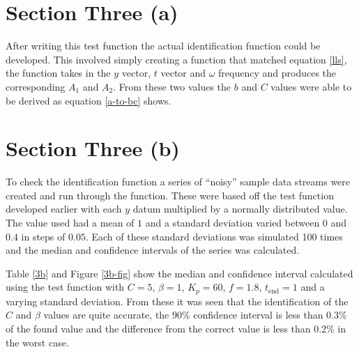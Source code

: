 \section*{Section Three (a)}

After writing this test function the actual identification function could be
developed.  This involved simply creating a function that matched equation
\ref{lls}, the function takes in the $y$ vector, $t$ vector and $\omega$
frequency and produces the corresponding $A_1$ and $A_2$.  From these two values
the $b$ and $C$ values were able to be derived as equation \ref{a-to-bc} shows.

\section*{Section Three (b)}

To check the identification function a series of ``noisy'' sample data streams
were created and run through the function.  These were based off the test function
developed earlier with each $y$ datum multiplied by a normally distributed
value.  The value used had a mean of $1$ and a standard deviation varied between
$0$ and $0.4$ in steps of $0.05$.  Each of these standard deviations was
simulated 100 times and the median and confidence intervals of the series was
calculated.

Table \ref{3b} and Figure \ref{3b-fig} show the median and confidence interval
calculated using the test function with $C = 5$, $\beta = 1$, $K_p = 60$, $f =
1.8$, $t_\text{end} = 1$ and a varying standard deviation.  From these it was
seen that the identification of the $C$ and $\beta$ values are quite accurate,
the 90\% confidence interval is less than 0.3\% of the found value and the
difference from the correct value is less than 0.2\% in the worst case.

